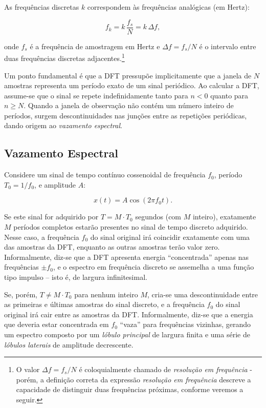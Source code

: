 \documentclass[a4paper,twoside,12pt]{article}
\begin{document}
	As frequências discretas $k$ correspondem às frequências analógicas (em Hertz):
	
	\begin{equation}
		f_k = k \, \frac{f_s}{N} = k \, \Delta f,
		\label{eq:freq_resolucao}
	\end{equation}
	
	\noindent onde $f_s$ é a frequência de amostragem em Hertz e $\Delta f = f_s / N$ é o intervalo entre duas frequências discretas adjacentes.\footnote{O valor $\Delta f = f_s / N$ é coloquialmente chamado de \emph{resolução em frequência} - porém, a definição correta da expressão \emph{resolução em frequência} descreve a capacidade de distinguir duas frequências próximas, conforme veremos a seguir.}
	
	Um ponto fundamental é que a DFT pressupõe implicitamente que a janela de $N$ amostras representa um período exato de um sinal periódico. Ao calcular a DFT, assume-se que o sinal se repete indefinidamente tanto para $n < 0$ quanto para $n \geq N$. Quando a janela de observação não contém um número inteiro de períodos, surgem descontinuidades nas junções entre as repetições periódicas, dando origem ao \emph{vazamento espectral}.
	
	\subsection{Vazamento Espectral}
	
	Considere um sinal de tempo contínuo cossenoidal de frequência $f_0$, período $T_0 = 1/f_0$, e amplitude $A$:
	
	\begin{equation}
		x(t) = A \cos(2\pi f_0 t).
		\label{eq:cosseno}
	\end{equation}
	
	Se este sinal for adquirido por $T = M \cdot T_0$ segundos (com $M$ inteiro), exatamente $M$ períodos completos estarão presentes no sinal de tempo discreto adquirido. Nesse caso, a frequência $f_0$ do sinal original irá coincidir exatamente com uma das amostras da DFT, enquanto as outras amostras terão valor zero. Informalmente, diz-se que a DFT apresenta energia ``concentrada'' apenas nas frequências $\pm f_0$, e o espectro em frequência discreto se assemelha a uma função tipo impulso -- isto é, de largura infinitesimal.
	
	Se, porém, $T \neq M \cdot T_0$ para nenhum inteiro $M$, cria-se uma descontinuidade entre as primeiras e últimas amostras do sinal discreto, e a frequência $f_0$ do sinal original irá cair entre as amostras da DFT. Informalmente, diz-se que a energia que deveria estar concentrada em $f_0$ ``vaza'' para frequências vizinhas, gerando um espectro composto por um \emph{lóbulo principal} de largura finita e uma série de \emph{lóbulos laterais} de amplitude decrescente.
	
\end{document}
